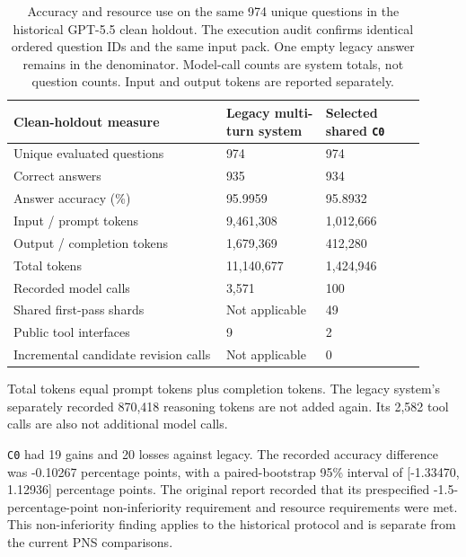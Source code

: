 \begin{table}[htbp]
\centering
\small
\setlength{\tabcolsep}{4pt}
\renewcommand{\arraystretch}{1.12}
\caption[Shared first-pass system comparison]{Accuracy and resource use on the same 974 unique questions in the historical GPT-5.5 clean holdout. The execution audit confirms identical ordered question IDs and the same input pack. One empty legacy answer remains in the denominator. Model-call counts are system totals, not question counts. Input and output tokens are reported separately.}
\label{tab:system-shared-first-pass}
\begin{tabular}{p{0.47\linewidth}p{0.22\linewidth}p{0.22\linewidth}}
\hline
Clean-holdout measure & Legacy multi-turn system & Selected shared \texttt{C0} \\
\hline
Unique evaluated questions & 974 & 974 \\
Correct answers & 935 & 934 \\
Answer accuracy (\%) & 95.9959 & 95.8932 \\
Input / prompt tokens & 9,461,308 & 1,012,666 \\
Output / completion tokens & 1,679,369 & 412,280 \\
Total tokens & 11,140,677 & 1,424,946 \\
Recorded model calls & 3,571 & 100 \\
Shared first-pass shards & Not applicable & 49 \\
Public tool interfaces & 9 & 2 \\
Incremental candidate revision calls & Not applicable & 0 \\
\hline
\end{tabular}
\end{table}

Total tokens equal prompt tokens plus completion tokens. The legacy system's separately recorded 870,418 reasoning tokens are not added again. Its 2,582 tool calls are also not additional model calls.

\texttt{C0} had 19 gains and 20 losses against legacy. The recorded accuracy difference was -0.10267 percentage points, with a paired-bootstrap 95\% interval of [-1.33470, 1.12936] percentage points. The original report recorded that its prespecified -1.5-percentage-point non-inferiority requirement and resource requirements were met. This non-inferiority finding applies to the historical protocol and is separate from the current PNS comparisons.

